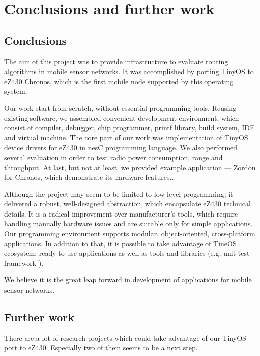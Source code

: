 \chapter{Conclusions and further work}

\section{Conclusions}


The aim of this project was to provide infrastructure to evaluate routing algorithms in mobile sensor networks.
It was accomplished by porting TinyOS to eZ430 Chronos, which is the first mobile node supported by this operating system.

Our work start from scratch, without essential programming tools.
Reusing existing software, we assembled convenient development environment, which consist of compiler, debugger, chip programmer, printf library, build system, IDE and virtual machine.
The core part of our work was implementation of TinyOS device drivers for eZ430 in nesC programming language.
We also performed several evaluation in order to test radio power consumption, range and throughput.
At last, but not at least, we provided example application --- Zordon for Chronos, which demonstrate its hardware features..

Although the project may seem to be limited to low-level programming, it delivered a robust, well-designed abstraction, which encapsulate eZ430 technical details.
It is a radical improvement over manufacturer's tools, which require handling manually hardware issues and are suitable only for simple applications.
Our programming environment supports modular, object-oriented, cross-platform applications.
In addition to that, it is possible to take advantage of TineOS ecosystem:
ready to use applications as well as tools and libraries (e.g. unit-test framework \cite{TOSMOCK}).

We believe it is the great leap forward in development of applications for mobile sensor networks.


\section{Further work}
There are a lot of research projects which could take advantage of our TinyOS port to eZ430.
Especially two of them seems to be a next step.

